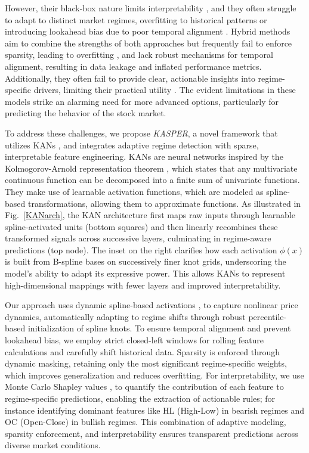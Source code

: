 \documentclass[conference,10pt]{IEEEtran}
\begin{document}
However, their black-box nature limits interpretability \cite{chen2023instructzero}, and they often struggle to adapt to distinct market regimes, overfitting to historical patterns or introducing lookahead bias due to poor temporal alignment \cite{bhandari2022predicting,zhang2022transformer}. Hybrid methods aim to combine the strengths of both approaches but frequently fail to enforce sparsity, leading to overfitting \cite{islam2024revolutionizing}, and lack robust mechanisms for temporal alignment, resulting in data leakage and inflated performance metrics. Additionally, they often fail to provide clear, actionable insights into regime-specific drivers, limiting their practical utility \cite{haase2023predictability}. The evident limitations in these models strike an alarming need for more advanced options, particularly for predicting the behavior of the stock market. 

To address these challenges, we propose \textit{KASPER}, a novel framework that utilizes KANs \cite{liu2024kan}, and integrates adaptive regime detection with sparse, interpretable feature engineering. KANs are neural networks inspired by the Kolmogorov-Arnold representation theorem \cite{schmidt2021kolmogorov}, which states that any multivariate continuous function can be decomposed into a finite sum of univariate functions. They make use of learnable activation functions, which are modeled as spline-based transformations, allowing them to approximate functions. As illustrated in Fig.~\ref {KANarch}, the KAN architecture first maps raw inputs through learnable spline‐activated units (bottom squares) and then linearly recombines these transformed signals across successive layers, culminating in regime-aware predictions (top node). The inset on the right clarifies how each activation $\phi(x)$ is built from B-spline bases on successively finer knot grids, underscoring the model's ability to adapt its expressive power. This allows KANs to represent high-dimensional mappings with fewer layers and improved interpretability. 

Our approach uses dynamic spline-based activations \cite{vecci1998learning}, to capture nonlinear price dynamics, automatically adapting to regime shifts through robust percentile-based initialization of spline knots. To ensure temporal alignment and prevent lookahead bias, we employ strict closed-left windows for rolling feature calculations and carefully shift historical data. Sparsity is enforced through dynamic masking, retaining only the most significant regime-specific weights, which improves generalization and reduces overfitting. For interpretability, we use Monte Carlo Shapley values \cite{ghorbani2019data}, to quantify the contribution of each feature to regime-specific predictions, enabling the extraction of actionable rules; for instance identifying dominant features like HL (High-Low) in bearish regimes and OC (Open-Close) in bullish regimes. This combination of adaptive modeling, sparsity enforcement, and interpretability ensures transparent predictions across diverse market conditions.
\end{document}
